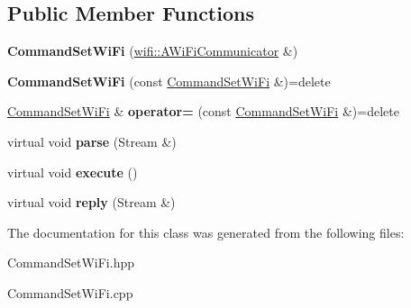 \subsection*{Public Member Functions}
\begin{DoxyCompactItemize}
\item 
\mbox{\label{classwood_box_1_1communication_1_1commands_1_1_command_set_wi_fi_ab2a87abf9f2adbfb4274325bc0808d62}} 
{\bfseries Command\+Set\+Wi\+Fi} (\mbox{\hyperlink{classwood_box_1_1communication_1_1wifi_1_1_a_wi_fi_communicator}{wifi\+::\+A\+Wi\+Fi\+Communicator}} \&)
\item 
\mbox{\label{classwood_box_1_1communication_1_1commands_1_1_command_set_wi_fi_ac2a83301978b8c5caedbfe9550739c6d}} 
{\bfseries Command\+Set\+Wi\+Fi} (const \mbox{\hyperlink{classwood_box_1_1communication_1_1commands_1_1_command_set_wi_fi}{Command\+Set\+Wi\+Fi}} \&)=delete
\item 
\mbox{\label{classwood_box_1_1communication_1_1commands_1_1_command_set_wi_fi_ae75518186c9db39992718bbe09d8e594}} 
\mbox{\hyperlink{classwood_box_1_1communication_1_1commands_1_1_command_set_wi_fi}{Command\+Set\+Wi\+Fi}} \& {\bfseries operator=} (const \mbox{\hyperlink{classwood_box_1_1communication_1_1commands_1_1_command_set_wi_fi}{Command\+Set\+Wi\+Fi}} \&)=delete
\item 
\mbox{\label{classwood_box_1_1communication_1_1commands_1_1_command_set_wi_fi_a1fe9a0798b8502acf76fd787a632b6f1}} 
virtual void {\bfseries parse} (Stream \&)
\item 
\mbox{\label{classwood_box_1_1communication_1_1commands_1_1_command_set_wi_fi_ad94b980986a752bf0cd5778487313d8f}} 
virtual void {\bfseries execute} ()
\item 
\mbox{\label{classwood_box_1_1communication_1_1commands_1_1_command_set_wi_fi_a364a4dbaf01a1815e296fc1569665522}} 
virtual void {\bfseries reply} (Stream \&)
\end{DoxyCompactItemize}


The documentation for this class was generated from the following files\+:\begin{DoxyCompactItemize}
\item 
Command\+Set\+Wi\+Fi.\+hpp\item 
Command\+Set\+Wi\+Fi.\+cpp\end{DoxyCompactItemize}
